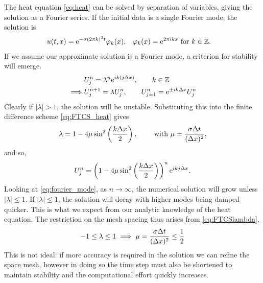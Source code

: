     The heat equation \eqref{eq:heat} can be solved by separation of variables, giving the solution as a Fourier series. If the initial data is a single Fourier mode, the solution is
    \begin{align*}
    &u(t,x) = \mathrm{e}^{-\sigma(2\pi k)^2 t} \varphi_k(x), && \varphi_k(x) = \mathrm{e}^{2\pi i k x} \text{ for } k \in \mathbb{Z}.
    \end{align*} 
    If we assume our approximate solution is a Fourier mode, a criterion for stability will emerge.
    \begin{align}
    &U^n_j = \lambda^n \mathrm{e}^{ik(j\Delta x)}, \qquad k \in \mathbb{Z} \label{eq:fourier_mode}\\
    \implies &U^{n+1}_j = \lambda U^n_j, \qquad U^n_{j\pm 1} = \mathrm{e}^{\pm ik\Delta x}U^n_j \notag \\
    \end{align}
    Clearly if $|\lambda|>1$, the solution will be unstable. Substituting this into the finite difference scheme \eqref{eq:FTCS_heat} gives
    \begin{equation}\label{eq:FTCSlambda}
    \lambda = 1 - 4\mu \sin^2\left(\frac{k\Delta x}{2}\right), \qquad \text{ with } \mu = \frac{\sigma \Delta t}{(\Delta x) ^2},
    \end{equation}
    and so,
    \[
    U^n_j = \left(1 - 4\mu \sin^2\left(\frac{k\Delta x}{2}\right)\right)^n\mathrm{e}^{ikj\Delta x}.
    \]
    Looking at \eqref{eq:fourier_mode}, as $n \to \infty$, the numerical solution will grow unless $|\lambda|\leq 1$. If  $|\lambda|\leq 1$, the solution will decay with higher modes being damped quicker. This is what we expect from our analytic knowledge of the heat equation. The restriction on the mesh spacing thus arises from \eqref{eq:FTCSlambda}, 
    \begin{align*}
    -1 \leq \lambda \leq 1 \implies  \mu = \frac{\sigma \Delta t}{(\Delta x) ^2} \leq \frac{1}{2}
    \end{align*}
    This is not ideal: if more accuracy is required in the solution we can refine the space mesh, however in doing so the time step must also be shortened to maintain stability and the computational effort quickly increases.
    
